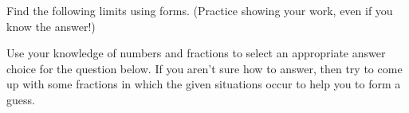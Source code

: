 \documentclass[10pt]{article}
\begin{document}
 Find the following limits using forms. (Practice showing your work, even if you know the answer!) \\

\vfill
\newpage

\lform  {}


 Use your knowledge of numbers and fractions to select an appropriate answer choice for the question below. If you aren't sure how to answer, then try to come up with some fractions in which the given situations occur to help you to form a guess.\\
\end{document}
